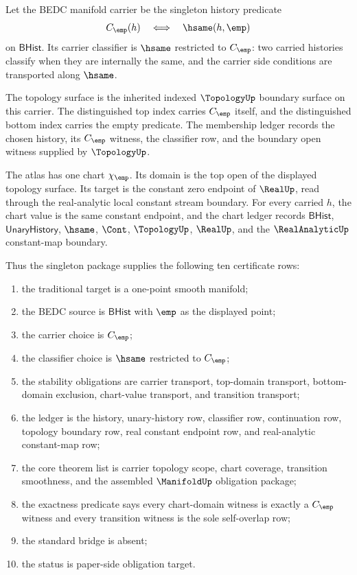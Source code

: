 \begin{definition}
\label{def:manifold-singleton-empty-chart-package}
Let the BEDC manifold carrier be the singleton history predicate
$$
C_{\emp}(h)\quad\Longleftrightarrow\quad \hsame(h,\emp)
$$
on $\mathsf{BHist}$. Its carrier classifier is $\hsame$ restricted to
$C_{\emp}$: two carried histories classify when they are internally the same,
and the carrier side conditions are transported along $\hsame$.

The topology surface is the inherited indexed $\TopologyUp$ boundary surface on
this carrier. The distinguished top index carries $C_{\emp}$ itself, and the
distinguished bottom index carries the empty predicate. The membership ledger
records the chosen history, its $C_{\emp}$ witness, the classifier row, and the
boundary open witness supplied by $\TopologyUp$.

The atlas has one chart $\chi_{\emp}$. Its domain is the top open of the
displayed topology surface. Its target is the constant zero endpoint of
$\RealUp$, read through the real-analytic local constant stream boundary. For
every carried $h$, the chart value is the same constant endpoint, and the chart
ledger records $\mathsf{BHist}$, $\mathsf{UnaryHistory}$, $\hsame$, $\Cont$,
$\TopologyUp$, $\RealUp$, and the $\RealAnalyticUp$ constant-map boundary.

Thus the singleton package supplies the following ten certificate rows:
\begin{enumerate}
\item the traditional target is a one-point smooth manifold;
\item the BEDC source is $\mathsf{BHist}$ with $\emp$ as the displayed point;
\item the carrier choice is $C_{\emp}$;
\item the classifier choice is $\hsame$ restricted to $C_{\emp}$;
\item the stability obligations are carrier transport, top-domain transport,
bottom-domain exclusion, chart-value transport, and transition transport;
\item the ledger is the history, unary-history row, classifier row,
continuation row, topology boundary row, real constant endpoint row, and
real-analytic constant-map row;
\item the core theorem list is carrier topology scope, chart coverage,
transition smoothness, and the assembled $\ManifoldUp$ obligation package;
\item the exactness predicate says every chart-domain witness is exactly a
$C_{\emp}$ witness and every transition witness is the sole self-overlap row;
\item the standard bridge is absent;
\item the status is paper-side obligation target.
\end{enumerate}
\end{definition}
